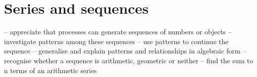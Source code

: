 \chapter{Series and sequences}

– appreciate that processes can generate
sequences of numbers or objects
– investigate patterns among these
sequences
– use patterns to continue the sequence
– generalise and explain patterns and
relationships in algebraic form
– recognise whether a sequence is
arithmetic, geometric or neither
– find the sum to n terms of an arithmetic
series
